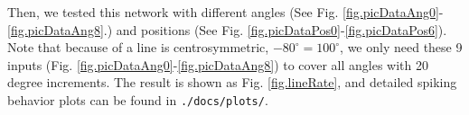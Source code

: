 \documentclass[11pt]{article}
\begin{document}
    Then, we tested this network with different angles (See Fig. \ref{fig.picDataAng0}-\ref{fig.picDataAng8}.) and positions (See Fig. \ref{fig.picDataPos0}-\ref{fig.picDataPos6}). Note that because of a line is centrosymmetric, $-80 ^\circ = 100 ^\circ$, we only need these 9 inputs (Fig. \ref{fig.picDataAng0}-\ref{fig.picDataAng8}) to cover all angles with 20 degree increments. The result is shown as Fig. \ref{fig.lineRate}, and detailed spiking behavior plots can be found in \texttt{./docs/plots/}. 

    \begin{figure}[htbp]
        \centering

\end{figure}
\end{document}
